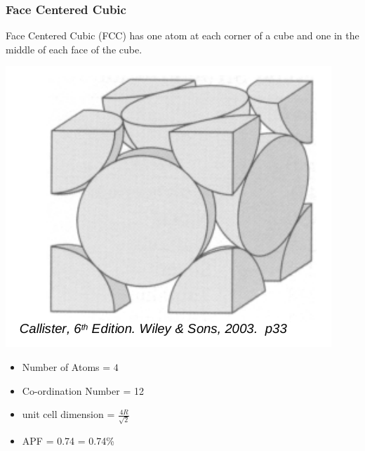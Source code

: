 \documentclass[12pt]{article}
\begin{document}
\subsubsection{Face Centered Cubic}
Face Centered Cubic (FCC) has one atom at each corner of a cube and one in the middle of each face of the cube.
\begin{marginfigure}
  \vspace{ -1cm }
  \includegraphics[scale=0.11]{fcc}
\end{marginfigure}

\begin{itemize}
  \item Number of Atoms = $4$
  \item Co-ordination Number = 12 
  \item unit cell dimension = $\frac{4R}{\sqrt{2}}$
  \item APF = 0.74 = 0.74\%
\end{itemize}
\end{document}
